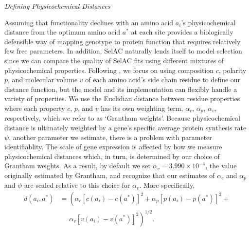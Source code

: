 \documentclass[12pt,letterpaper,fleqn]{article}
\renewcommand{\subsection}[1]{%
\bigskip
\begin{center}
\begin{large}
\normalfont\itshape #1
\end{large}
\end{center}}
\newcommand{\selac}{SelAC\xspace}
\newcommand{\alphac}{\ensuremath{\alpha_c}\xspace}
\newcommand{\alphap}{\ensuremath{\alpha_p}\xspace}
\newcommand{\alphav}{\ensuremath{\alpha_v}\xspace}
\newcommand{\aopt}{\ensuremath{a^*}\xspace}
\begin{document}
\subsection{Defining Physicochemical Distances}
Assuming that functionality declines with an amino acid $a_i$'s physicochemical distance from the optimum amino acid \aopt at each site provides a biologically defensible way of mapping genotype to protein function that requires relatively few free parameters.
In addition, \selac naturally lends itself to model selection since we can compare the quality of \selac fits using different mixtures of physicochemical properties.
Following \cite{Grantham1974}, we focus on using composition $c$, polarity $p$, and molecular volume $v$ of each amino acid's side chain residue to define our distance function, but the model and its implementation can flexibly handle a variety of properties.
We use the Euclidian distance between residue properties where each property $c$, $p$, and $v$ has its own weighting term, $\alphac$, $\alphap$, $\alphav$, respectively, which we refer to as `Grantham weights'.
Because physicochemical distance is ultimately weighted by a gene's specific average protein synthesis rate $\psi$, another parameter we estimate, there is a problem with parameter identifiablity.
The scale of gene expression is affected by how we measure physicochemical distances which, in turn, is determined by our choice of Grantham weights.
As a result, by default we set $\alphav = 3.990 \times 10^{-4}$, the value originally estimated by Grantham, and recognize that our estimates of $\alphac$ and $\alphap$ and $\psi$ are scaled relative to this choice for $\alphav$.
More specifically,
\begin{align*}
  d(a_i, \aopt) &= \left(\alphac \left[c\left(a_i\right) - c\left(\aopt\right)\right]^2 + \alphap \left[p\left(a_i\right) - p\left(\aopt\right)\right]^2 + \right.\\
  & \;\;\;\;\;\left. \alphav \left[v\left(a_i\right) - v\left(\aopt\right)\right]^2\right)^{1/2}.
\end{align*}
\end{document}

